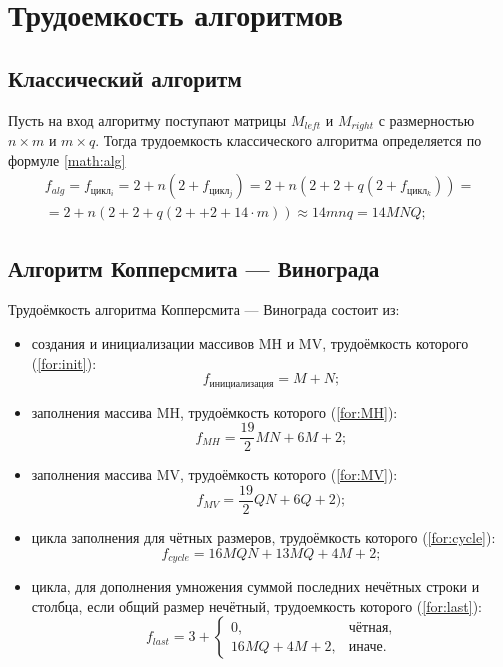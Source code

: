 \section{Трудоемкость алгоритмов}

\subsection{Классический алгоритм}

Пусть на вход алгоритму поступают матрицы $M_{left}$ и $M_{right}$ с размерностью $n \times m$ и $m \times q$. Тогда трудоемкость классического алгоритма определяется по формуле \ref{math:alg}
\begin{multline}\label{math:alg}
	f_{alg} = f_{{цикл_i}} = 2 + n\left(2 + f_{цикл_j}\right) = 2 + n\left(2 + 2 + q\left(2 + f_{цикл_k}\right)\right) = \\
	= 2 + n\left(2 + 2 + q\left(2 + +2 + 14 \cdot m\right)\right) \approx 14mnq = 14MNQ;
\end{multline}
\subsection{Алгоритм Копперсмита — Винограда}

Трудоёмкость алгоритма Копперсмита — Винограда состоит из:
\begin{itemize}
	\item создания и инициализации массивов MH и MV, трудоёмкость которого (\ref{for:init}):
	\begin{equation}
		\label{for:init}
		f_{инициализация} = M + N;
	\end{equation}
	
	\item заполнения массива MH, трудоёмкость которого (\ref{for:MH}):
	\begin{equation}
		\label{for:MH}
		f_{MH} = \frac{19}{2}MN +6M +2;
	\end{equation}
	
	\item заполнения массива MV, трудоёмкость которого (\ref{for:MV}):
	\begin{equation}
		\label{for:MV}
		f_{MV} = \frac{19}{2}QN +6Q +2);
	\end{equation}
	
	\item цикла заполнения для чётных размеров, трудоёмкость которого (\ref{for:cycle}):
	\begin{equation}
		\label{for:cycle}
		f_{cycle} = 16MQN + 13MQ + 4M + 2;
	\end{equation}
	
	\item цикла, для дополнения умножения суммой последних нечётных строки и столбца, если общий размер нечётный, трудоемкость которого (\ref{for:last}):
	\begin{equation}
		\label{for:last}
		f_{last} = 3 + \begin{cases}
			0, & \text{чётная,}\\
			16MQ + 4M + 2, & \text{иначе.}
		\end{cases}
	\end{equation}
\end{itemize}

